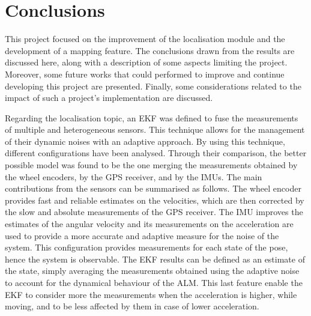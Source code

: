 \chapter{Conclusions}
\label{ch:conclusion}


\noindent
This project focused on the improvement of the localisation module and the development of a mapping feature.
The conclusions drawn from the results are discussed here, along with a description of some aspects limiting the project.
Moreover, some future works that could performed to improve and continue developing this project are presented.
Finally, some considerations related to the impact of such a project's implementation are discussed.

Regarding the localisation topic, an \gls{EKF} was defined to fuse the measurements of multiple and heterogeneous sensors.
This technique allows for the management of their dynamic noises with an adaptive approach.
By using this technique, different configurations have been analysed.
Through their comparison, the better possible model was found to be the one merging the measurements obtained by the wheel encoders, by the \gls{GPS} receiver, and by the \glspl{IMU}.
The main contributions from the sensors can be summarised as follows.
The wheel encoder provides fast and reliable estimates on the velocities, which are then corrected by the slow and absolute measurements of the \gls{GPS} receiver. The \gls{IMU} improves the estimates of the angular velocity and its measurements on the acceleration are used to provide a more accurate and adaptive measure for the noise of the system.
This configuration provides measurements for each state of the pose, hence the system is observable.
The \gls{EKF} results can be defined as an estimate of the state, simply averaging the measurements obtained using the adaptive noise to account for the dynamical behaviour of the \gls{ALM}.
This last feature enable the \gls{EKF} to consider more the measurements when the acceleration is higher, while moving, and to be less affected by them in case of lower acceleration.

